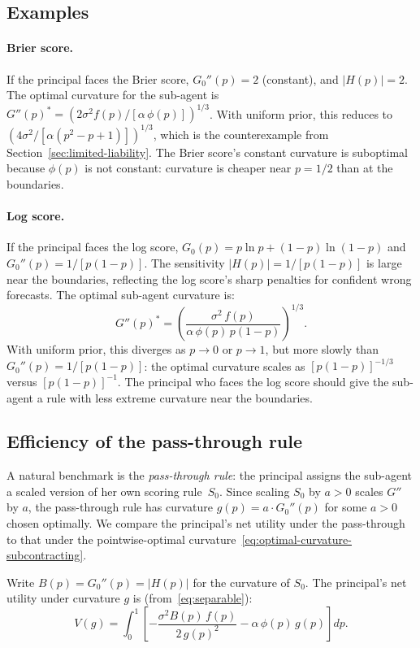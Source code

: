 \documentclass[11pt]{article}
\begin{document}
\subsection{Examples}

\paragraph{Brier score.} If the principal faces the Brier score, $G_0''(p) = 2$ (constant), and $|H(p)| = 2$. The optimal curvature for the sub-agent is $G''(p)^* = (2\sigma^2 f(p)/[\alpha\,\phi(p)])^{1/3}$. With uniform prior, this reduces to $(4\sigma^2/[\alpha(p^2 - p + 1)])^{1/3}$, which is the counterexample from Section~\ref{sec:limited-liability}. The Brier score's constant curvature is suboptimal because $\phi(p)$ is not constant: curvature is cheaper near $p = 1/2$ than at the boundaries.

\paragraph{Log score.} If the principal faces the log score, $G_0(p) = p\ln p + (1-p)\ln(1-p)$ and $G_0''(p) = 1/[p(1-p)]$. The sensitivity $|H(p)| = 1/[p(1-p)]$ is large near the boundaries, reflecting the log score's sharp penalties for confident wrong forecasts. The optimal sub-agent curvature is:
\[
G''(p)^* = \left(\frac{\sigma^2\,f(p)}{\alpha\,\phi(p)\,p(1-p)}\right)^{1/3}.
\]
With uniform prior, this diverges as $p \to 0$ or $p \to 1$, but more slowly than $G_0''(p) = 1/[p(1-p)]$: the optimal curvature scales as $[p(1-p)]^{-1/3}$ versus $[p(1-p)]^{-1}$. The principal who faces the log score should give the sub-agent a rule with less extreme curvature near the boundaries.

\subsection{Efficiency of the pass-through rule}

A natural benchmark is the \emph{pass-through rule}: the principal assigns the sub-agent a scaled version of her own scoring rule~$S_0$. Since scaling $S_0$ by $a > 0$ scales $G''$ by $a$, the pass-through rule has curvature $g(p) = a \cdot G_0''(p)$ for some $a > 0$ chosen optimally. We compare the principal's net utility under the pass-through to that under the pointwise-optimal curvature~\eqref{eq:optimal-curvature-subcontracting}.

Write $B(p) = G_0''(p) = |H(p)|$ for the curvature of $S_0$. The principal's net utility under curvature $g$ is (from~\eqref{eq:separable}):
\[
V(g) = \int_0^1 \left[ -\frac{\sigma^2 B(p)\,f(p)}{2\,g(p)^2} - \alpha\,\phi(p)\,g(p) \right] dp.
\]
\end{document}
